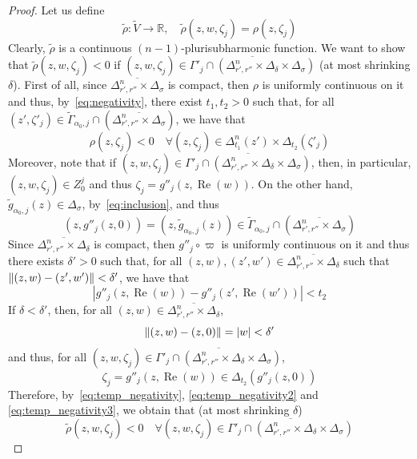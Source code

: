 \documentclass[reqno,oneside]{amsart}
\newcommand{\numberset}{\mathbb}
\newcommand{\R}{\numberset{R}}
\DeclarePairedDelimiter{\norm}{\lVert}{\rVert}
\DeclareMathOperator{\Realpart}{Re}
\renewcommand{\Re}{\Realpart}
\theoremstyle{definition}
\theoremstyle{plain}
\theoremstyle{remark}
\begin{document}
\begin{proof}
    Let us define
    \[
        \tilde\rho:\tilde{V}\to\R, \quad \tilde\rho(z,w,\zeta_j)=\rho(z,\zeta_j)
    \]
    Clearly, $\tilde\rho$ is a continuous $(n-1)$-plurisubharmonic function. We want to show that $\tilde\rho(z,w,\zeta_j)<0$ if $(z,w,\zeta_j)\in\overline{\Gamma'_j\cap(\Delta_{r',r''}^n\times\Delta_\delta\times\Delta_\sigma)}$ (at most shrinking $\delta$). First of all, since $\overline{\Delta^n_{r',r''}\times\Delta_\sigma}$ is compact, then $\rho$ is uniformly continuous on it and thus, by~\eqref{eq:negativity}, there exist $t_1,t_2>0$ such that, for all $(z',\zeta'_j)\in\tilde\Gamma_{\alpha_0,j}\cap(\overline{\Delta_{r',r''}^n\times\Delta_\sigma})$, we have that
    \begin{equation}
    \label{eq:temp_negativity}
        \rho(z,\zeta_j)<0 \quad \forall(z,\zeta_j)\in\Delta^n_{t_1}(z')\times\Delta_{t_2}(\zeta'_j)
    \end{equation}
    Moreover, note that if $(z,w,\zeta_j)\in\overline{\Gamma'_j\cap(\Delta_{r',r''}^n\times\Delta_\delta\times\Delta_\sigma)}$, then, in particular, $(z,w,\zeta_j)\in Z^j_0$ and thus $\zeta_j=g''_j(z,\Re(w))$. On the other hand, $\tilde{g}_{\alpha_0,j}(z)\in\Delta_\sigma$, by~\eqref{eq:inclusion}, and thus 
    \begin{equation}
    \label{eq:temp_negativity2}
        (z,g''_j(z,0))=(z,\tilde{g}_{\alpha_0,j}(z))\in\tilde\Gamma_{\alpha_0,j}\cap(\overline{\Delta_{r',r''}^n\times\Delta_\sigma})
    \end{equation}
    Since $\overline{\Delta^n_{r',r''}\times\Delta_\delta}$ is compact, then $g''_j\circ\varpi$ is uniformly continuous on it and thus there exists $\delta'>0$ such that, for all $(z,w),(z',w')\in\overline{\Delta^n_{r',r''}\times\Delta_\delta}$ such that $\norm{(z,w)-(z',w')}<\delta'$, we have that
    \[
        |g''_j(z,\Re(w))-g''_j(z',\Re(w'))|<t_2
    \]
    If $\delta<\delta'$, then, for all $(z,w)\in\overline{\Delta^n_{r',r''}\times\Delta_\delta}$,
    \[
        \norm{(z,w)-(z,0)}=|w|<\delta'
    \]    
    and thus, for all $(z,w,\zeta_j)\in\overline{\Gamma'_j\cap(\Delta_{r',r''}^n\times\Delta_\delta\times\Delta_\sigma)}$,
    \begin{equation}
    \label{eq:temp_negativity3}
        \zeta_j=g''_j(z,\Re(w))\in\Delta_{t_2}(g''_j(z,0))
    \end{equation}
    Therefore, by~\eqref{eq:temp_negativity}, \eqref{eq:temp_negativity2} and \eqref{eq:temp_negativity3}, we obtain that (at most shrinking $\delta$)
    \begin{equation}
    \label{eq:negativity2}
        \tilde\rho(z,w,\zeta_j)<0 \quad \forall(z,w,\zeta_j)\in\overline{\Gamma'_j\cap(\Delta_{r',r''}^n\times\Delta_\delta\times\Delta_\sigma)}
    \end{equation}


\end{proof}
\end{document}
